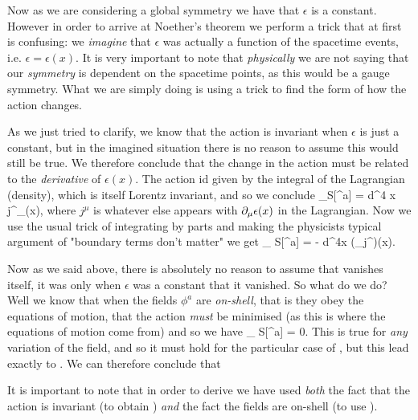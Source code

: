 Now as we are considering a global symmetry we have that $\epsilon$ is a constant. However in order to arrive at Noether's theorem we perform a trick that at first is confusing: we \textit{imagine} that $\epsilon$ was actually a function of the spacetime events, i.e. $\epsilon = \epsilon(x)$. It is very important to note that \textit{physically} we are not saying that our \textit{symmetry} is dependent on the spacetime points, as this would be a gauge symmetry. What we are simply doing is using a trick to find the form of how the action changes. 

As we just tried to clarify, we know that the action is invariant when $\epsilon$ is just a constant, but in the imagined situation there is no reason to assume this would still be true. We therefore conclude that the change in the action must be related to the \textit{derivative} of $\epsilon(x)$. The action id given by the integral of the Lagrangian (density), which is itself Lorentz invariant, and so we conclude 
\bse 
    \del_{\epsilon}S[\phi^a] = \int d^4 x \, j^{\mu}\p_{\mu}\epsilon(x),
\ese 
where $j^{\mu}$ is whatever else appears with $\partial_{\mu}\epsilon(x)$ in the Lagrangian. Now we use the usual trick of integrating by parts and making the physicists typical argument of "boundary terms don't matter" we get
\be 
\label{eqn:VariationOfActionEpsilon}
    \del_{\epsilon} S[\phi^a] = - \int d^4x (\p_{\mu}j^{\mu})\epsilon(x).
\ee 

Now as we said above, there is absolutely no reason to assume that  vanishes itself, it was only when $\epsilon$ was a constant that it vanished. So what do we do? Well we know that when the fields $\phi^a$ are \textit{on-shell}, that is they obey the equations of motion, that the action \textit{must} be minimised (as this is where the equations of motion come from) and so we have 
\be 
\label{eqn:VariationActionField}
    \del_{\phi} S[\phi^a] = 0.
\ee 
This is true for \textit{any} variation of the field, and so it must hold for the particular case of , but this lead exactly to . We can therefore conclude that 

\br 
    It is important to note that in order to derive  we have used \textit{both} the fact that the action is invariant (to obtain ) \textit{and} the fact the fields are on-shell (to use ). 
\er 

